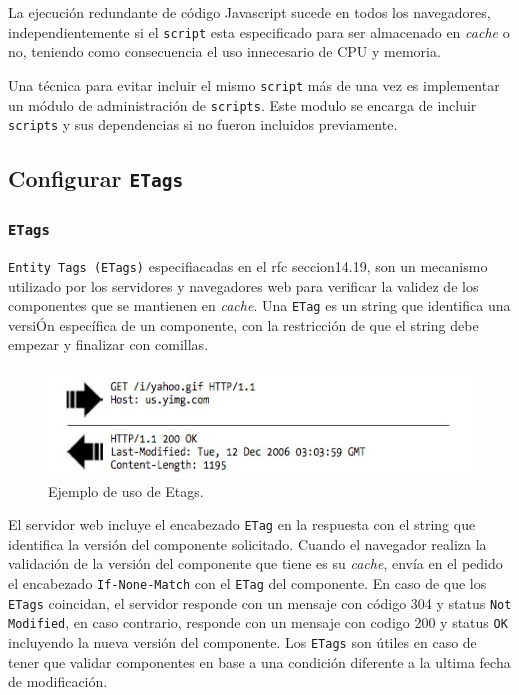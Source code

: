 \documentclass[a4paper,12pt]{report}
\begin{document}
La ejecución redundante de código Javascript sucede en todos los navegadores, independientemente si el \texttt{script} esta especificado para ser almacenado
en \emph{cache} o no, teniendo como consecuencia el uso innecesario de CPU y memoria.

Una técnica para evitar incluir el mismo \texttt{script} más de una vez es implementar un módulo de administración de \texttt{scripts}. Este modulo se encarga de incluir
\texttt{scripts} y sus dependencias si no fueron incluidos previamente.

\subsection{Configurar \texttt{ETags}}

\subsubsection{\texttt{ETags}}
\texttt{Entity Tags (ETags)} especifiacadas en el rfc \cite{rfc2616} seccion14.19, son un mecanismo utilizado por los servidores y navegadores web para verificar la validez de los componentes
que se mantienen en \emph{cache}. Una \texttt{ETag} es un string que identifica una versiÓn específica de un componente, con la restricción de que el string debe empezar
y finalizar con comillas.

\begin{figure}[h]
\centering
\includegraphics[width=1\textwidth]{figuras/hpws/etags.jpg}
	\caption{Ejemplo de uso de Etags.}
    \label{fig.redirect}
\end{figure}

El servidor web incluye el encabezado \texttt{ETag} en la respuesta con el string que identifica la versión del componente solicitado. Cuando el navegador realiza la
validación de la versión del componente que tiene es su \emph{cache}, envía en el pedido el encabezado \texttt{If-None-Match} con el \texttt{ETag} del componente. En caso de que
los \texttt{ETags} coincidan, el servidor responde con un mensaje con código 304 y status \texttt{Not Modified}, en caso contrario, responde con un mensaje con codigo 200
y status \texttt{OK} incluyendo la nueva versión del componente. Los \texttt{ETags} son útiles en caso de tener que validar componentes en base a una condición diferente
a la ultima fecha de modificación.
\end{document}
